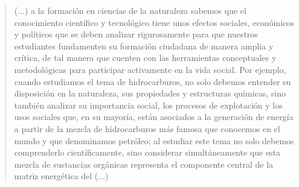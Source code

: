 \documentclass[12pt]{article}
\begin{document}
	\begin{quote}
		(...) a la formación en ciencias de la naturaleza sabemos que el conocimiento científico y tecnológico tiene unos efectos sociales, económicos y políticos que se deben analizar rigurosamente para que nuestros estudiantes fundamenten su formación ciudadana de manera amplia y crítica, de tal manera que cuenten con las herramientas conceptuales y metodológicas para participar activamente en la vida social. Por ejemplo, cuando estudiamos el tema de hidrocarburos, no solo debemos entender su disposición en la naturaleza, sus propiedades y estructuras químicas, sino también analizar su importancia social, los procesos de explotación y los usos sociales que, en su mayoría, están asociados a la generación de energía a partir de la mezcla de hidrocarburos más famosa que conocemos en el mundo y que denominamos petróleo; al estudiar este tema no solo debemos comprenderlo científicamente, sino considerar simultáneamente que esta mezcla de sustancias orgánicas representa el componente central de la matriz energética del (...)
	\end{quote}
\end{document}

